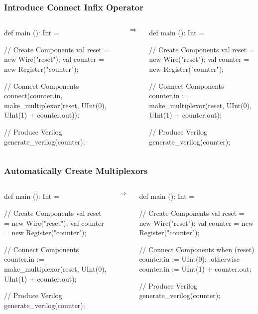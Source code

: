 \begin{frame}[fragile]
\frametitle{Introduce Connect Infix Operator}
\begin{columns}
{
\begin{scala}
def main (): Int = {
  // Create Components
  val reset   = new Wire("reset");
  val counter = new Register("counter");

  // Connect Components
  connect(counter.in, 
    make_multiplexor(reset,
      UInt(0),
      UInt(1) + counter.out));

  // Produce Verilog
  generate_verilog(counter);
}
\end{scala}
}
\begin{center}
$\Rightarrow$
\end{center}
{
\begin{scala}
def main (): Int = {
  // Create Components
  val reset   = new Wire("reset");
  val counter = new Register("counter");

  // Connect Components
  counter.in :=
    make_multiplexor(reset,
      UInt(0),
      UInt(1) + counter.out);

  // Produce Verilog
  generate_verilog(counter);
}
\end{scala}
}
\end{columns}
\end{frame}

\begin{frame}[fragile]
\frametitle{Automatically Create Multiplexors}
\begin{columns}
{
\begin{scala}
def main (): Int = {
  // Create Components
  val reset   = new Wire("reset");
  val counter = new Register("counter");

  // Connect Components
  counter.in :=
    make_multiplexor(reset,
      UInt(0),
      UInt(1) + counter.out);

  // Produce Verilog
  generate_verilog(counter);
}
\end{scala}
}
\begin{center}
$\Rightarrow$
\end{center}
{
\begin{scala}
def main (): Int = {
  // Create Components
  val reset   = new Wire("reset");
  val counter = new Register("counter");

  // Connect Components
  when (reset) {
    counter.in := UInt(0);
  } .otherwise {
    counter.in := UInt(1) + counter.out;
  }

  // Produce Verilog
  generate_verilog(counter);
}
\end{scala}
}
\end{columns}
\end{frame}

